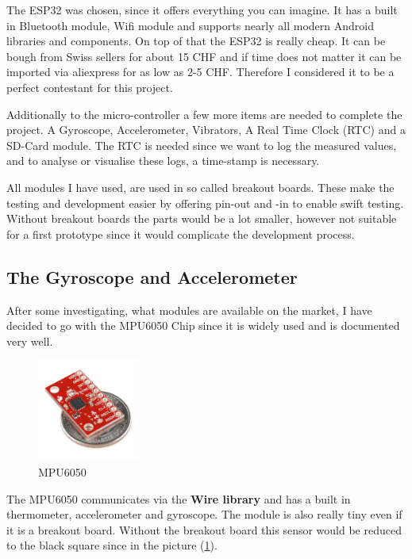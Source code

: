 The ESP32 was chosen, since it offers everything you can imagine. It has a built in Bluetooth module, Wifi module and supports nearly all modern Android libraries and components. On top of that the ESP32 is really cheap. It can be bough from Swiss sellers for about 15 CHF and if time does not matter it can be imported via aliexpress for as low as 2-5 CHF. Therefore I considered it to be a perfect contestant for this project. 

Additionally to the micro-controller a few more items are needed to complete the project. A Gyroscope, Accelerometer, Vibrators, A Real Time Clock (RTC) and a SD-Card module. The RTC is needed since we want to log the measured values, and to analyse or visualise these logs, a time-stamp is necessary. 

All modules I have used, are used in so called breakout boards. These make the testing and development easier by offering pin-out and -in to enable swift testing. Without breakout boards the parts would be a lot smaller, however not suitable for a first prototype since it would complicate the development process.

\subsection{The Gyroscope and Accelerometer}

After some investigating, what modules are available on the market, I have decided to go with the 
MPU6050 Chip since it is widely used and is documented very well. 

\begin{figure}
  \begin{center}
\includegraphics[width=0.3\textwidth]{images/MPU_6050.jpg}
  \end{center}
  \caption{MPU6050}
  \label{fig:MPU6050}
\end{figure}

The MPU6050 communicates via the \textbf{Wire library} and has a built in thermometer, accelerometer and gyroscope. The module is also really tiny even if it is a breakout board.
Without the breakout board this sensor would be reduced to the black square since in the picture  (\ref{fig:MPU6050}).

